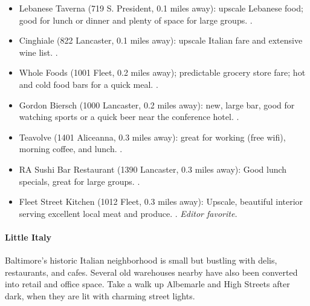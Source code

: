 \begin{itemize}
\item{Lebanese Taverna (719 S. President, 0.1 miles away): upscale Lebanese food; good for lunch or dinner and plenty of space for large groups. \professor.}
\item{Cinghiale (822 Lancaster, 0.1 miles away): upscale Italian fare and extensive wine list. \industry.}
\item{Whole Foods (1001 Fleet, 0.2 miles away); predictable grocery store fare; hot and cold food bars for a quick meal. \gradstudent.}
\item{Gordon Biersch (1000 Lancaster, 0.2 miles away): new, large bar, good for watching sports or a quick beer near the conference hotel. \postdoc.}
\item{Teavolve (1401 Aliceanna, 0.3 miles away): great for working (free wifi), morning coffee, and lunch. \gradstudent.}
\item{RA Sushi Bar Restaurant (1390 Lancaster, 0.3 miles away): Good lunch specials, great for large groups. \postdoc.} 
\item{Fleet Street Kitchen (1012 Fleet, 0.3 miles away): Upscale, beautiful interior serving excellent local meat and produce. \professor. \it{Editor favorite}.}
\end{itemize}

\paragraph*{Little Italy}
Baltimore's historic Italian neighborhood is small but bustling with delis, restaurants, and cafes. Several old warehouses nearby have also been converted into retail and office space. Take a walk up Albemarle and High Streets after dark, when they are lit with charming street lights.

